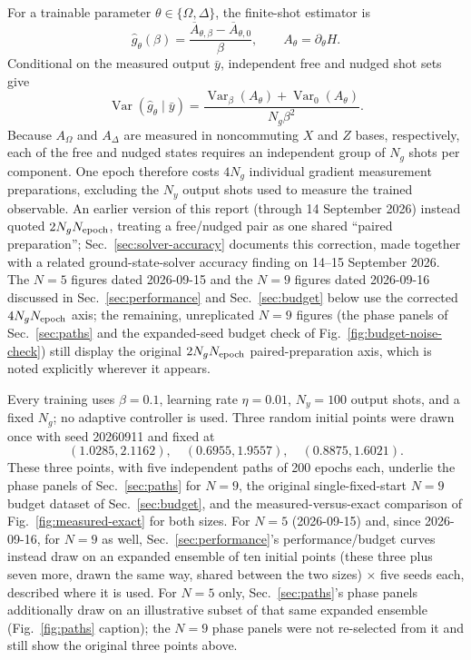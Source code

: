 \documentclass[11pt]{article}
\begin{document}
For a trainable parameter $\theta\in\{\Omega,\Delta\}$, the finite-shot estimator is
\begin{equation}
\widehat g_\theta(\beta)=
\frac{\overline{A}_{\theta,\beta}-\overline{A}_{\theta,0}}{\beta},
\qquad A_\theta=\partial_\theta H .
\end{equation}
Conditional on the measured output $\bar y$, independent free and nudged shot sets give
\begin{equation}
\operatorname{Var}(\widehat g_\theta\mid\bar y)=
\frac{\operatorname{Var}_\beta(A_\theta)+
      \operatorname{Var}_0(A_\theta)}{N_g\beta^2}.
\label{eq:variance}
\end{equation}
Because $A_\Omega$ and $A_\Delta$ are measured in noncommuting $X$ and $Z$ bases,
respectively, each of the free and nudged states requires an independent group of
$N_g$ shots per component.  One epoch therefore costs $4N_g$ individual gradient
measurement preparations, excluding the $N_y$ output shots used to measure the
trained observable.  An earlier version of this report (through 14 September 2026)
instead quoted $2N_gN_{\rm epoch}$, treating a free/nudged pair as one shared
``paired preparation''; Sec.~\ref{sec:solver-accuracy} documents this correction,
made together with a related ground-state-solver accuracy finding on 14--15
September 2026.  The $N=5$ figures dated 2026-09-15 and the $N=9$ figures dated
2026-09-16 discussed in Sec.~\ref{sec:performance} and Sec.~\ref{sec:budget} below
use the corrected $4N_gN_{\rm epoch}$ axis; the remaining, unreplicated $N=9$
figures (the phase panels of Sec.~\ref{sec:paths} and the expanded-seed budget
check of Fig.~\ref{fig:budget-noise-check}) still display the original
$2N_gN_{\rm epoch}$ paired-preparation axis, which is noted explicitly wherever it
appears.

Every training uses $\beta=0.1$, learning rate $\eta=0.01$, $N_y=100$ output shots,
and a fixed $N_g$; no adaptive controller is used.  Three random initial points were
drawn once with seed 20260911 and fixed at
\begin{equation}
(1.0285,2.1162),\quad(0.6955,1.9557),\quad(0.8875,1.6021).
\end{equation}
These three points, with five independent paths of 200 epochs each, underlie the
phase panels of Sec.~\ref{sec:paths} for $N=9$, the original single-fixed-start
$N=9$ budget dataset of Sec.~\ref{sec:budget}, and the measured-versus-exact
comparison of Fig.~\ref{fig:measured-exact} for both sizes.  For $N=5$
(2026-09-15) and, since 2026-09-16, for $N=9$ as well,
Sec.~\ref{sec:performance}'s performance/budget curves instead draw on an
expanded ensemble of ten initial points (these three plus seven more, drawn the
same way, shared between the two sizes) $\times$ five seeds each, described where
it is used.  For $N=5$ only, Sec.~\ref{sec:paths}'s phase panels additionally draw
on an illustrative subset of that same expanded ensemble (Fig.~\ref{fig:paths}
caption); the $N=9$ phase panels were not re-selected from it and still show the
original three points above.
\end{document}
